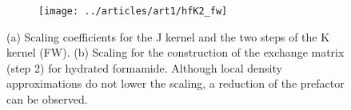 \begin{figure}[htp]

\begin{subtable}{\textwidth}
\caption{}
\label{tab:GS_DFJKSCALE_FW}
\end{subtable}

\vspace{1.5\baselineskip}

\begin{subfigure}{\textwidth}
\centering
\texttt{[image: ../articles/art1/hfK2\_fw]}
\caption{}
\label{fig:GS_DFK2SCALE_FW}
\end{subfigure}

\caption{(a) Scaling coefficients for the J kernel and the two steps of the K kernel (FW). (b) Scaling for the construction of the exchange matrix (step 2) for hydrated formamide. Although local density approximations do not lower the scaling, a reduction of the prefactor can be observed.}

\end{figure}


